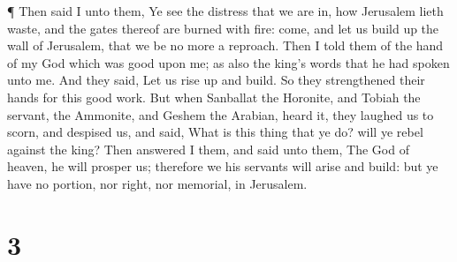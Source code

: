  ¶ Then said I unto them, Ye see the distress that we are
in, how Jerusalem lieth waste, and the gates thereof are burned with
fire: come, and let us build up the wall of Jerusalem, that we be no
more a reproach.  Then I told them of the hand of my God
which was good upon me; as also the king's words that he had spoken unto
me. And they said, Let us rise up and build. So they strengthened their
hands for this good work.  But when Sanballat the Horonite,
and Tobiah the servant, the Ammonite, and Geshem the Arabian, heard it,
they laughed us to scorn, and despised us, and said, What is this thing
that ye do? will ye rebel against the king?  Then answered
I them, and said unto them, The God of heaven, he will prosper us;
therefore we his servants will arise and build: but ye have no portion,
nor right, nor memorial, in Jerusalem.

\hypertarget{section-2}{%
\section{3}\label{section-2}}

